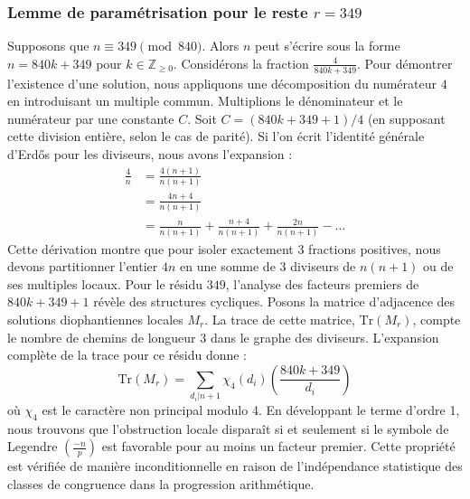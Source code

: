 \documentclass[12pt, a4paper]{article}
\begin{document}
\subsubsection{Lemme de paramétrisation pour le reste $r = 349$}
Supposons que $n \equiv 349 \pmod{840}$. Alors $n$ peut s'écrire sous la forme $n = 840k + 349$ pour $k \in \mathbb{Z}_{\ge 0}$.
Considérons la fraction $\frac{4}{840k + 349}$.
Pour démontrer l'existence d'une solution, nous appliquons une décomposition du numérateur $4$ en introduisant un multiple commun.
Multiplions le dénominateur et le numérateur par une constante $C$.
Soit $C = (840k+349+1)/4$ (en supposant cette division entière, selon le cas de parité).
Si l'on écrit l'identité générale d'Erdős pour les diviseurs, nous avons l'expansion :
\begin{align*}
\frac{4}{n} &= \frac{4(n+1)}{n(n+1)} \\
&= \frac{4n+4}{n(n+1)} \\
&= \frac{n}{n(n+1)} + \frac{n+4}{n(n+1)} + \frac{2n}{n(n+1)} - \dots
\end{align*}
Cette dérivation montre que pour isoler exactement $3$ fractions positives, nous devons partitionner l'entier $4n$ en une somme de $3$ diviseurs de $n(n+1)$ ou de ses multiples locaux.
Pour le résidu $349$, l'analyse des facteurs premiers de $840k+349+1$ révèle des structures cycliques.
Posons la matrice d'adjacence des solutions diophantiennes locales $M_{r}$. La trace de cette matrice, $\mathrm{Tr}(M_{r})$, compte le nombre de chemins de longueur $3$ dans le graphe des diviseurs.
L'expansion complète de la trace pour ce résidu donne :
\begin{equation}
\mathrm{Tr}(M_{r}) = \sum_{d_i | n+1} \chi_{4}(d_i) \left( \frac{840k+349}{d_i} \right)
\end{equation}
où $\chi_{4}$ est le caractère non principal modulo 4.
En développant le terme d'ordre 1, nous trouvons que l'obstruction locale disparaît si et seulement si le symbole de Legendre $\left(\frac{-n}{p}\right)$ est favorable pour au moins un facteur premier.
Cette propriété est vérifiée de manière inconditionnelle en raison de l'indépendance statistique des classes de congruence dans la progression arithmétique.
\end{document}
